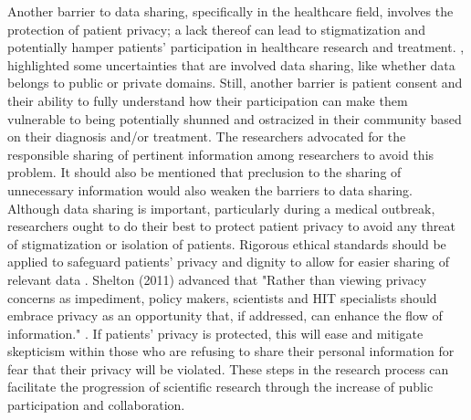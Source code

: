 \documentclass[sigconf]{acmart}
\begin{document}
Another barrier to data sharing, specifically in the healthcare field, involves the protection of patient privacy; a lack thereof can lead to stigmatization and potentially hamper patients’ participation in healthcare research and treatment. \cite{yozwiak2015data}, highlighted some uncertainties that are involved data sharing, like whether data belongs to public or private domains. Still, another barrier is patient consent and their ability to fully understand how their participation can make them vulnerable to being potentially shunned and ostracized in their community based on their diagnosis and/or treatment. The researchers advocated for the responsible sharing of pertinent information among researchers to avoid this problem. It should also be mentioned that preclusion to the sharing of unnecessary information would also weaken the barriers to data sharing. Although data sharing is important, particularly during a medical outbreak, researchers ought to do their best to protect patient privacy to avoid any threat of stigmatization or isolation of patients. Rigorous ethical standards should be applied to safeguard patients’ privacy and dignity to allow for easier sharing of relevant data \cite{yozwiak2015data}. Shelton (2011) advanced that "Rather than viewing privacy concerns as impediment, policy makers, scientists and HIT specialists should embrace privacy as an opportunity that, if addressed, can enhance the flow of information." \cite{shelton2011electronic}. If patients' privacy is protected, this will ease and mitigate skepticism within those who are refusing to share their personal information for fear that their privacy will be violated. These steps in the research process can facilitate the progression of scientific research through the increase of public participation and collaboration. 
\end{document}
